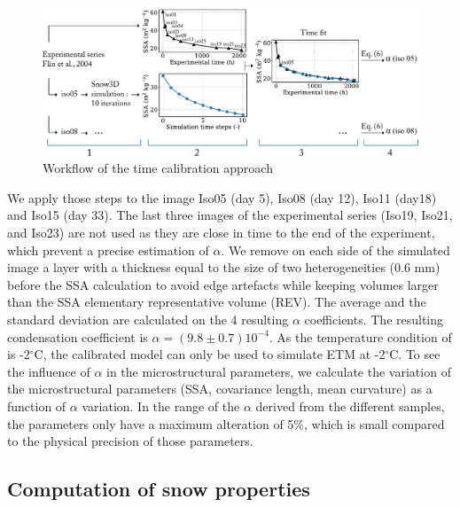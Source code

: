 \documentclass[draft,ms]{agujournal2019}
\begin{document}
\hspace*{-0.2cm}
\begin{figure}
    \centering
    \includegraphics[width = \linewidth]{Figures/workflow_aff.pdf}
    \caption{Workflow of the time calibration approach}
    \label{fig:workflow}
\end{figure}
We apply those steps to the image Iso05 (day 5), Iso08 (day 12), Iso11 (day18) and Iso15 (day 33). The last three images of the experimental series (Iso19, Iso21, and Iso23) are not used as they are close in time to the end of the experiment, which prevent a precise estimation of $\alpha$. We remove on each side of the simulated image a layer with a thickness equal to the size of two heterogeneities (0.6 mm) before the SSA calculation to avoid edge artefacts while keeping volumes larger than the SSA elementary representative volume (REV). The average and the standard deviation are calculated on the 4 resulting $\alpha$ coefficients. The resulting condensation coefficient is $\alpha = ( 9.8 \pm 0.7) 10^{-4}$. As the temperature condition of  is -2$^\circ$C, the calibrated model can only be used to simulate ETM at -2$^\circ$C. To see the influence of $\alpha$ in the microstructural parameters, we calculate the variation of the microstructural parameters (SSA, covariance length, mean curvature) as a function of $\alpha$ variation. In the range of the $\alpha$ derived from the different samples, the parameters only have a maximum alteration of 5\%, which is small compared to the physical precision of those parameters. 

\subsection{Computation of snow properties}
\label{subsec:methode_physical_appli}
\end{document}
